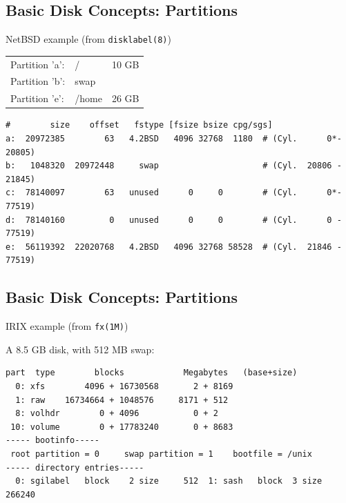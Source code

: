 \documentclass[xga]{xdvislides}
\begin{document}
\subsection{Basic Disk Concepts: Partitions}
NetBSD example (from {\tt disklabel(8)})

\begin{tabular}{ l l c }
Partition 'a': & / & 10 GB\\
Partition 'b': & swap & \\
Partition 'e': & /home & 26 GB\\
\end{tabular}

\begin{verbatim}
#        size    offset   fstype [fsize bsize cpg/sgs]
a:  20972385        63   4.2BSD   4096 32768  1180  # (Cyl.      0*- 20805)
b:   1048320  20972448     swap                     # (Cyl.  20806 - 21845)
c:  78140097        63   unused      0     0        # (Cyl.      0*- 77519)
d:  78140160         0   unused      0     0        # (Cyl.      0 - 77519)
e:  56119392  22020768   4.2BSD   4096 32768 58528  # (Cyl.  21846 - 77519)
\end{verbatim}


\subsection{Basic Disk Concepts: Partitions}
IRIX example (from {\tt fx(1M)})

A 8.5 GB disk, with 512 MB swap:
\begin{verbatim}
part  type        blocks            Megabytes   (base+size)
  0: xfs        4096 + 16730568       2 + 8169
  1: raw    16734664 + 1048576     8171 + 512
  8: volhdr        0 + 4096           0 + 2
 10: volume        0 + 17783240       0 + 8683
----- bootinfo-----
 root partition = 0     swap partition = 1    bootfile = /unix
----- directory entries-----
  0: sgilabel   block    2 size     512  1: sash   block  3 size  266240
\end{verbatim}
\end{document}
